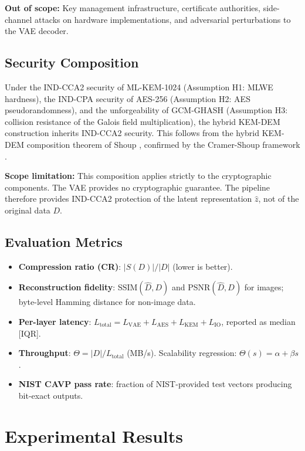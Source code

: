 \documentclass[twocolumn]{article}
\begin{document}
\textbf{Out of scope:} Key management infrastructure, certificate authorities,
side-channel attacks on hardware implementations, and adversarial perturbations
to the VAE decoder.

\subsection{Security Composition}

Under the IND-CCA2 security of ML-KEM-1024 (Assumption H1: MLWE hardness), the
IND-CPA security of AES-256 (Assumption H2: AES pseudorandomness), and the
unforgeability of GCM-GHASH (Assumption H3: collision resistance of the Galois
field multiplication), the hybrid KEM-DEM construction inherits IND-CCA2
security. This follows from the hybrid KEM-DEM composition theorem of Shoup
\cite{shoup2001}, confirmed by the Cramer-Shoup framework \cite{cramer2003}.

\textbf{Scope limitation:} This composition applies strictly to the cryptographic
components. The VAE provides no cryptographic guarantee. The pipeline therefore
provides IND-CCA2 protection of the latent representation $\hat{z}$, not of the
original data $D$.

\subsection{Evaluation Metrics}

\begin{itemize}
  \item \textbf{Compression ratio (CR)}: $|S(D)|/|D|$ (lower is better).
  \item \textbf{Reconstruction fidelity}: SSIM$(\hat{D}, D)$ and PSNR$(\hat{D}, D)$ for images; byte-level Hamming distance for non-image data.
  \item \textbf{Per-layer latency}: $L_\text{total} = L_\text{VAE} + L_\text{AES} + L_\text{KEM} + L_\text{IO}$, reported as median [IQR].
  \item \textbf{Throughput}: $\Theta = |D|/L_\text{total}$ (MB/s). Scalability regression: $\Theta(s) = \alpha + \beta s$.
  \item \textbf{NIST CAVP pass rate}: fraction of NIST-provided test vectors producing bit-exact outputs.
\end{itemize}

\section{Experimental Results}
\end{document}

